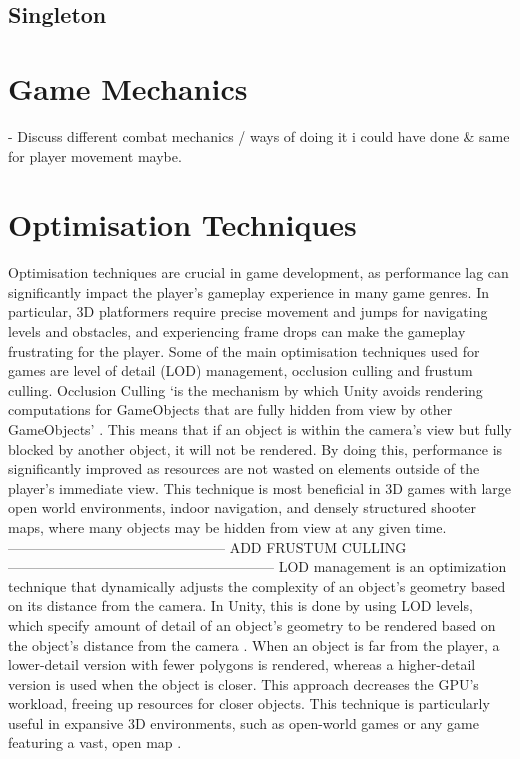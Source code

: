 \documentclass[]{final_report}
\begin{document}
\subsection{Singleton}\label{singleton}

\section{Game Mechanics}
- Discuss different combat mechanics / ways of doing it i could have done \& same for player movement maybe.

\section{Optimisation Techniques}
\color{red}
Optimisation techniques are crucial in game development, as performance lag can significantly impact the player's gameplay experience in many game genres. In particular, 3D platformers require precise movement and jumps for navigating levels and obstacles, and experiencing frame drops can make the gameplay frustrating for the player. Some of the main optimisation techniques used for games are level of detail (LOD) management, occlusion culling and frustum culling. \newline
Occlusion Culling ‘is the mechanism by which Unity avoids rendering computations for GameObjects that are fully hidden from view by other GameObjects’ \cite{Singh2022}. This means that if an object is within the camera's view but fully blocked by another object, it will not be rendered. By doing this, performance is significantly improved as resources are not wasted on elements outside of the player's immediate view. This technique is most beneficial in 3D games with large open world environments, indoor navigation, and densely structured shooter maps, where many objects may be hidden from view at any given time.
----------------------------------------------- ADD FRUSTUM CULLING ---------------------------------------------------------
LOD management is an optimization technique that dynamically adjusts the complexity of an object's geometry based on its distance from the camera. In Unity, this is done by using LOD levels, which specify amount of detail of an object’s geometry to be rendered based on the object’s distance from the camera \cite{Unity2024LOD}. When an object is far from the player, a lower-detail version with fewer polygons is rendered, whereas a higher-detail version is used when the object is closer. This approach decreases the GPU's workload, freeing up resources for closer objects. This technique is particularly useful in expansive 3D environments, such as open-world games or any game featuring a vast, open map \cite{IndieGamesDevel}.
\color{black}
\end{document}
